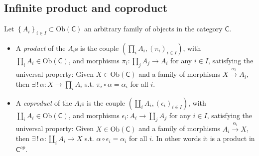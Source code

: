 \subsection{Infinite product and coproduct}

\begin{defn}
	Let $\left\{ A_i \right\}_{i \in I} \subset \mathrm{Ob} \left(\mathsf{C}\right)$ an arbitrary family of objects in the category $\mathsf{C}$.
	 \begin{itemize}
		 \item A {\em product} of the $A_i$s is the couple $\left(\prod_i A_i, (\pi_i)_{i \in I} \right)$, with $\prod_i A_i \in \mathrm{Ob} \left(\mathsf{C}\right)$, and morphisms $\pi_i\colon \prod_j A_j \to A_i$ for any $i \in I$, satisfying the universal property:
			 Given $X \in \mathrm{Ob} \left(\mathsf{C}\right)$ and a family of morphisms $X \xrightarrow{\alpha_i} A_i$, then $\exists\, !\, \alpha\colon X \to \prod_i A_i$ s.t. $\pi_i \circ \alpha = \alpha_i$ for all $i$.
		 \item A {\em coproduct} of the $A_i$s is the couple $\left(\coprod_i A_i, (\epsilon_i)_{i \in I} \right)$, with $\coprod_i A_i \in \mathrm{Ob} \left(\mathsf{C}\right)$, and morphisms $\epsilon_i\colon A_i \to \coprod_j A_j$ for any $i \in I$, satisfying the universal property:
			 Given $X \in \mathrm{Ob} \left(\mathsf{C}\right)$ and a family of morphisms $A_i \xrightarrow{\alpha_i} X$, then $\exists\, !\, \alpha\colon \coprod_i A_i \to X$ s.t. $\alpha \circ \epsilon_i = \alpha_i$ for all $i$.
			 In other words it is a product in $\mathsf{C}^{op}$.
	\end{itemize}
\end{defn}
 
